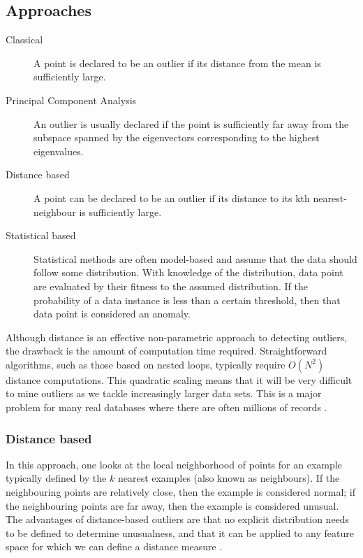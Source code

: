 \subsection{Approaches}

\begin{description}
\item[Classical] A point is declared to be an outlier if its distance from the 
mean is sufficiently large.
\item[Principal Component Analysis] An outlier is usually declared if the point 
is sufficiently far away from the subspace spanned by the eigenvectors 
corresponding to the highest eigenvalues.
\item[Distance based] A point can be declared to be an outlier if its distance 
to its kth nearest-neighbour is sufficiently large.
\item[Statistical based] Statistical methods are often model-based and assume 
that the data should follow some distribution. With knowledge of the 
distribution, data point are evaluated by their fitness to the assumed 
distribution. If the probability of a data instance is less than a certain 
threshold, then that data point is considered an anomaly.
\end{description}

Although distance is an effective non-parametric approach to detecting outliers,
the drawback is the amount of computation time required. Straightforward 
algorithms, such as those based on nested loops, typically require $O(N^{2})$
distance computations. This quadratic scaling means that it will be very 
difficult to mine outliers as we tackle increasingly larger data sets. This is a 
major problem for many real databases where there are often millions of records 
\cite{Bay:2003}.

\subsubsection{Distance based}
In this approach, one looks at the local neighborhood of points for an example 
typically defined by the $k$ nearest examples (also known as neighbours). If the
neighbouring points are relatively close, then the example is considered normal;
if the neighbouring points are far away, then the example is considered unusual.
The advantages of distance-based outliers are that no explicit distribution 
needs to be defined to determine unusualness, and that it can be applied to any 
feature space for which we can define a distance measure \cite{Bay:2003}.

